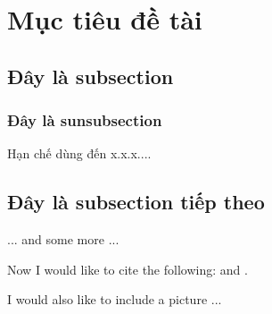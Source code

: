 \section{Mục tiêu đề tài}
 

\subsection{Đây là subsection }
\subsubsection{Đây là sunsubsection }
 
Hạn chế dùng đến x.x.x.... 
\subsection{Đây là subsection tiếp theo}
... and some more ...

Now I would like to cite the following: 
and \cite{Rud73}.

I would also like to include a picture ...

